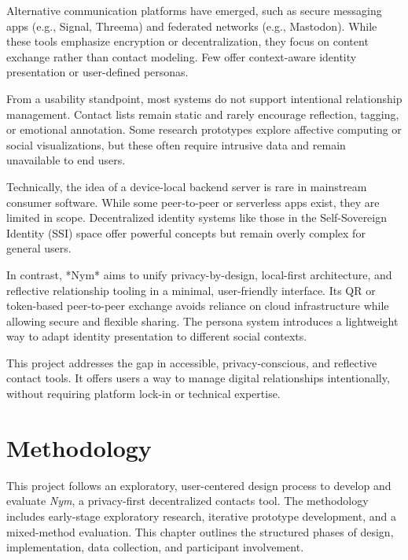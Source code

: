 \documentclass{imc-inf}
\begin{document}
Alternative communication platforms have emerged, such as secure messaging apps (e.g., Signal, Threema) and federated networks (e.g., Mastodon). While these tools emphasize encryption or decentralization, they focus on content exchange rather than contact modeling. Few offer context-aware identity presentation or user-defined personas.

From a usability standpoint, most systems do not support intentional relationship management. Contact lists remain static and rarely encourage reflection, tagging, or emotional annotation. Some research prototypes explore affective computing or social visualizations, but these often require intrusive data and remain unavailable to end users.

Technically, the idea of a device-local backend server is rare in mainstream consumer software. While some peer-to-peer or serverless apps exist, they are limited in scope. Decentralized identity systems like those in the Self-Sovereign Identity (SSI) space offer powerful concepts but remain overly complex for general users.

In contrast, *Nym* aims to unify privacy-by-design, local-first architecture, and reflective relationship tooling in a minimal, user-friendly interface. Its QR or token-based peer-to-peer exchange avoids reliance on cloud infrastructure while allowing secure and flexible sharing. The persona system introduces a lightweight way to adapt identity presentation to different social contexts.

This project addresses the gap in accessible, privacy-conscious, and reflective contact tools. It offers users a way to manage digital relationships intentionally, without requiring platform lock-in or technical expertise.


\chapter{Methodology}

This project follows an exploratory, user-centered design process to develop and evaluate \textit{Nym}, a privacy-first decentralized contacts tool. The methodology includes early-stage exploratory research, iterative prototype development, and a mixed-method evaluation. This chapter outlines the structured phases of design, implementation, data collection, and participant involvement.
\end{document}
